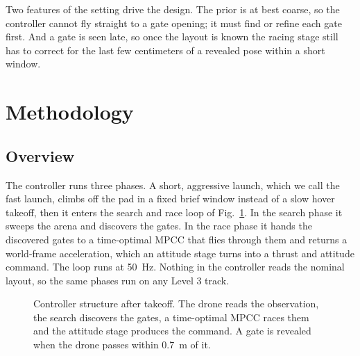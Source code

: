 \documentclass[conference]{IEEEtran}
\begin{document}
Two features of the setting drive the design. The prior is at best coarse, so the controller cannot fly straight to a gate opening; it must find or refine each gate first. And a gate is seen late, so once the layout is known the racing stage still has to correct for the last few centimeters of a revealed pose within a short window.

\section{Methodology}
\label{sec:method}

\subsection{Overview}
The controller runs three phases. A short, aggressive launch, which we call the fast launch, climbs off the pad in a fixed brief window instead of a slow hover takeoff, then it enters the search and race loop of Fig.~\ref{fig:pipeline}. In the search phase it sweeps the arena and discovers the gates. In the race phase it hands the discovered gates to a time-optimal MPCC that flies through them and returns a world-frame acceleration, which an attitude stage turns into a thrust and attitude command. The loop runs at 50~Hz. Nothing in the controller reads the nominal layout, so the same phases run on any Level 3 track.

\begin{figure}[t]
\centering
{}
\caption{Controller structure after takeoff. The drone reads the observation, the search discovers the gates, a time-optimal MPCC races them and the attitude stage produces the command. A gate is revealed when the drone passes within 0.7~m of it.}
\label{fig:pipeline}
\end{figure}
\end{document}
